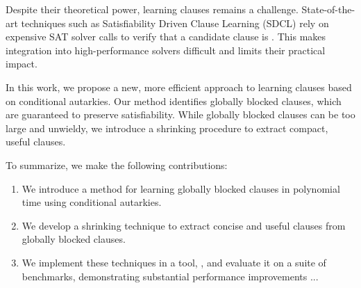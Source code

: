 Despite their theoretical power, learning \pr clauses remains a challenge. State-of-the-art techniques such as Satisfiability Driven Clause Learning (SDCL) rely on expensive SAT solver calls to verify that a candidate clause is \pr \cite{sadical}. This makes integration into high-performance solvers difficult and limits their practical impact.

In this work, we propose a new, more efficient approach to learning \pr clauses based on conditional autarkies. Our method identifies globally blocked clauses, which are guaranteed to preserve satisfiability. While globally blocked clauses can be too large and unwieldy, we introduce a shrinking procedure to extract compact, useful \pr clauses.



To summarize, we make the following contributions: 

\begin{enumerate} 
    \item We introduce a method for learning globally blocked clauses in polynomial time using conditional autarkies. 
    \item We develop a shrinking technique to extract concise and useful \pr clauses from globally blocked clauses. 
    \item We implement these techniques in a tool, \tool, and evaluate it on a suite of benchmarks, demonstrating substantial performance improvements ... 
\end{enumerate}